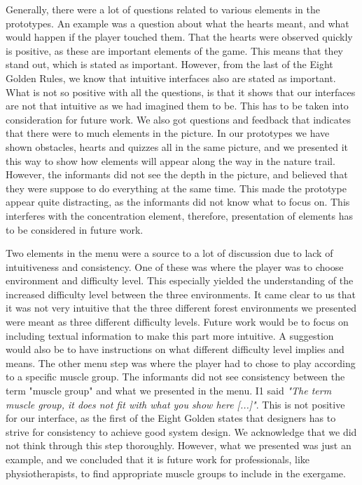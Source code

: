 Generally, there were a lot of questions related to various elements in the prototypes. An example was a question about what the hearts meant, and what would happen if the player touched them. That the hearts were observed quickly is positive, as these are important elements of the game. This means that they stand out, which is stated as important. However, from the last of the Eight Golden Rules, we know that intuitive interfaces also are stated as important. What is not so positive with all the questions, is that it shows that our interfaces are not that intuitive as we had imagined them to be. This has to be taken into consideration for future work. We also got questions and feedback that indicates that there were to much elements in the picture. In our prototypes we have shown obstacles, hearts and quizzes all in the same picture, and we presented it this way to show how elements will appear along the way in the nature trail. However, the informants did not see the depth in the picture, and believed that they were suppose to do everything at the same time. This made the prototype appear quite distracting, as the informants did not know what to focus on. This interferes with the concentration element, therefore, presentation of elements has to be considered in future work. 

Two elements in the menu were a source to a lot of discussion due to lack of intuitiveness and consistency. One of these was where the player was to choose environment and difficulty level. This especially yielded the understanding of the increased difficulty level between the three environments. It came clear to us that it was not very intuitive that the three different forest environments we presented were meant as three different difficulty levels. Future work would be to focus on including textual information to make this part more intuitive. A suggestion would also be to have instructions on what different difficulty level implies and means. The other menu step was where the player had to chose to play according to a specific muscle group. The informants did not see consistency between the term "muscle group" and what we presented in the menu. I1 said \emph{"The term muscle group, it does not fit with what you show here [...]"}. This is not positive for our interface, as the first of the Eight Golden states that designers has to strive for consistency to achieve good system design. We acknowledge that we did not think through this step thoroughly. However, what we presented was just an example, and we concluded that it is future work for professionals, like physiotherapists, to find appropriate muscle groups to include in the exergame.

